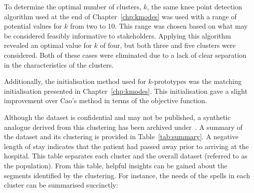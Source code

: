 To determine the optimal number of clusters, \(k\), the same knee point
detection algorithm used at the end of Chapter~\ref{chp:kmodes} was used with a
range of potential values for \(k\) from two to 10. This range was chosen based
on what may be considered feasibly informative to stakeholders. Applying this
algorithm revealed an optimal value for \(k\) of four, but both three and five
clusters were considered. Both of these cases were eliminated due to a lack of
clear separation in the characteristics of the clusters.

Additionally, the initialisation method used for \(k\)-prototypes was the
matching initialisation presented in Chapter~\ref{chp:kmodes}. This
initialisation gave a slight improvement over Cao's method in terms of the
objective function.

\begin{table}
    \centering
    \resizebox{\textwidth}{!}{%
        
    }\caption{%
        A summary of clinical and condition-specific characteristics for each
        cluster and the population
    }\label{tab:summary}
\end{table}

Although the dataset is confidential and may not be published, a synthetic
analogue derived from this clustering has been archived
under~. A summary of the dataset and its clustering
is provided in Table~\ref{tab:summary}. A negative length of stay indicates that
the patient had passed away prior to arriving at the hospital. This table
separates each cluster and the overall dataset (referred to as the population).
From this table, helpful insights can be gained about the segments identified by
the clustering. For instance, the needs of the spells in each cluster can be
summarised succinctly:

